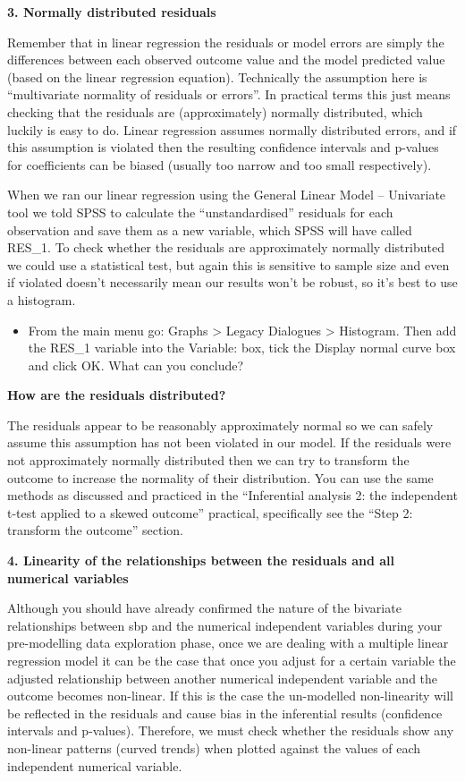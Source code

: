 \documentclass[
]{book}
\providecommand{\tightlist}{%
  \setlength{\itemsep}{0pt}\setlength{\parskip}{0pt}}
\begin{document}
\textbf{3. Normally distributed residuals}

Remember that in linear regression the residuals or model errors are simply the differences between each observed outcome value and the model predicted value (based on the linear regression equation). Technically the assumption here is ``multivariate normality of residuals or errors''. In practical terms this just means checking that the residuals are (approximately) normally distributed, which luckily is easy to do. Linear regression assumes normally distributed errors, and if this assumption is violated then the resulting confidence intervals and p-values for coefficients can be biased (usually too narrow and too small respectively).

When we ran our linear regression using the General Linear Model -- Univariate tool we told SPSS to calculate the ``unstandardised'' residuals for each observation and save them as a new variable, which SPSS will have called RES\_1. To check whether the residuals are approximately normally distributed we could use a statistical test, but again this is sensitive to sample size and even if violated doesn't necessarily mean our results won't be robust, so it's best to use a histogram.

\begin{itemize}
\tightlist
\item
  From the main menu go: Graphs \textgreater{} Legacy Dialogues \textgreater{} Histogram. Then add the RES\_1 variable into the Variable: box, tick the Display normal curve box and click OK. What can you conclude?
\end{itemize}

\textbf{How are the residuals distributed?}

The residuals appear to be reasonably approximately normal so we can safely assume this assumption has not been violated in our model. If the residuals were not approximately normally distributed then we can try to transform the outcome to increase the normality of their distribution. You can use the same methods as discussed and practiced in the ``Inferential analysis 2: the independent t-test applied to a skewed outcome'' practical, specifically see the ``Step 2: transform the outcome'' section.

\textbf{4. Linearity of the relationships between the residuals and all numerical variables}

Although you should have already confirmed the nature of the bivariate relationships between sbp and the numerical independent variables during your pre-modelling data exploration phase, once we are dealing with a multiple linear regression model it can be the case that once you adjust for a certain variable the adjusted relationship between another numerical independent variable and the outcome becomes non-linear. If this is the case the un-modelled non-linearity will be reflected in the residuals and cause bias in the inferential results (confidence intervals and p-values). Therefore, we must check whether the residuals show any non-linear patterns (curved trends) when plotted against the values of each independent numerical variable.
\end{document}
